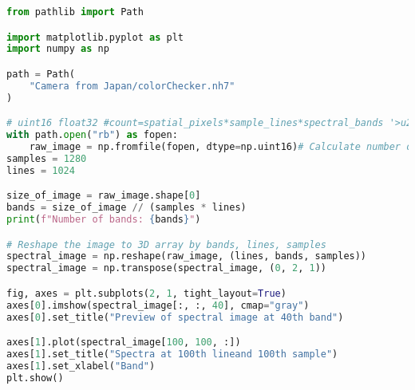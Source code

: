 \begin{lstlisting}[language=python, caption=Load Japanese camera, label={code:load-jp}]
from pathlib import Path

import matplotlib.pyplot as plt
import numpy as np

path = Path(
    "Camera from Japan/colorChecker.nh7"
)

# uint16 float32 #count=spatial_pixels*sample_lines*spectral_bands '>u2' numpy.uint16
with path.open("rb") as fopen:
    raw_image = np.fromfile(fopen, dtype=np.uint16)# Calculate number of bands from size of image
samples = 1280
lines = 1024

size_of_image = raw_image.shape[0]
bands = size_of_image // (samples * lines)
print(f"Number of bands: {bands}")

# Reshape the image to 3D array by bands, lines, samples
spectral_image = np.reshape(raw_image, (lines, bands, samples))
spectral_image = np.transpose(spectral_image, (0, 2, 1))

fig, axes = plt.subplots(2, 1, tight_layout=True)
axes[0].imshow(spectral_image[:, :, 40], cmap="gray")
axes[0].set_title("Preview of spectral image at 40th band")

axes[1].plot(spectral_image[100, 100, :])
axes[1].set_title("Spectra at 100th lineand 100th sample")
axes[1].set_xlabel("Band")
plt.show()
\end{lstlisting}
